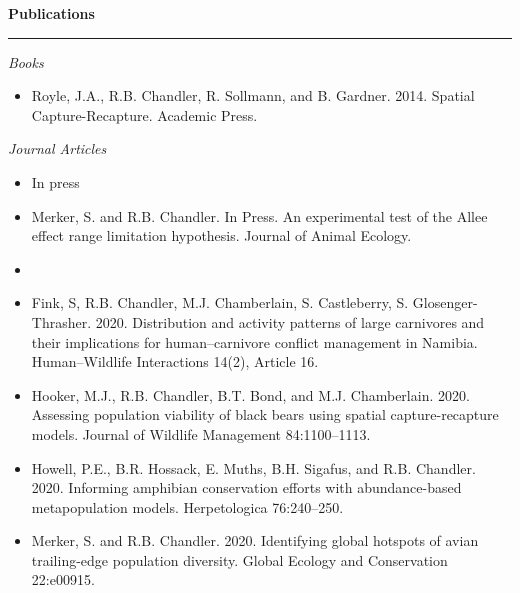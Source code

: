 {\large \bf Publications} \\
\rule[3mm]{\textwidth}{0.3mm}

\emph{Books}
\begin{itemize}

\item Royle, J.A., R.B. Chandler, R. Sollmann, and B. Gardner. 2014. Spatial
Capture-Recapture. Academic Press. 

\end{itemize}

\vspace{0.5cm}

\emph{Journal Articles}

\begin{itemize}






\item[] {\centering In press \\}

\item Merker, S. and R.B. Chandler. In Press. An experimental test of 
  the Allee effect range limitation hypothesis. Journal of Animal
  Ecology. 

\item[] { \\}

\item Fink, S, R.B. Chandler, M.J. Chamberlain, S. Castleberry,
  S. Glosenger-Thrasher. 2020. Distribution and activity patterns of 
  large carnivores and their implications for human–carnivore conflict 
  management in Namibia. Human–Wildlife Interactions 14(2), Article 16.    

\item Hooker, M.J., R.B. Chandler, B.T. Bond, and
  M.J. Chamberlain. 2020. Assessing population viability of black
  bears using spatial capture-recapture models. Journal of Wildlife
  Management 84:1100--1113.  
  
\item Howell, P.E., B.R. Hossack, E. Muths, B.H. Sigafus, and
  R.B. Chandler. 2020. Informing amphibian conservation efforts
  with abundance-based metapopulation models. Herpetologica 76:240--250. 

\item Merker, S. and R.B. Chandler. 2020. Identifying global hotspots
  of avian trailing-edge population diversity. Global Ecology and
  Conservation 22:e00915.   


\end{itemize}
